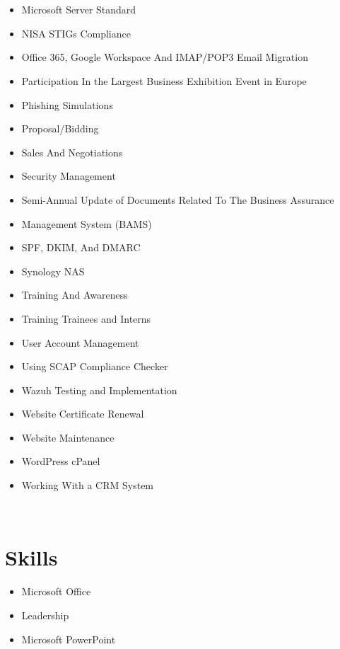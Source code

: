 \documentclass[letterpaper,10pt]{article}
\begin{document}
\begin{center}
\begin{minipage}[t]{0.5\textwidth}
				\section*{}
				\begin{itemize}
				
				
					\item Microsoft Server Standard
					\item NISA STIGs Compliance
					\item Office 365, Google Workspace And IMAP/POP3 Email Migration
					\item Participation In the Largest Business Exhibition Event in Europe
					\item Phishing Simulations
					\item Proposal/Bidding
					\item Sales And Negotiations
					\item Security Management
					\item Semi-Annual Update of Documents Related To The Business Assurance
					\item Management System (BAMS)
					\item SPF, DKIM, And DMARC
					\item Synology NAS
					\item Training And Awareness
					\item Training Trainees and Interns
					\item User Account Management
					\item Using SCAP Compliance Checker
					\item Wazuh Testing and Implementation
					\item Website Certificate Renewal
					\item Website Maintenance
					\item WordPress cPanel
					\item Working With a CRM System
				\end{itemize}
			\end{minipage}
		\\
	\begin{minipage}[t]{0.5\textwidth}
		\section*{Skills}
		\begin{itemize}
			\item {Microsoft Office}
			\item {Leadership}
			\item {Microsoft PowerPoint}
		\end{itemize}
	\end{minipage}%
	\begin{minipage}[t]{0.5\textwidth}

\end{minipage}
\end{center}
\end{document}
